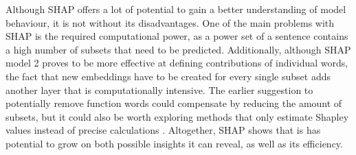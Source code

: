 Although SHAP offers a lot of potential to gain a better understanding of model behaviour, it is not without its disadvantages. One of the main problems with SHAP is the required computational power, as a power set of a sentence contains a high number of subsets that need to be predicted. Additionally, although SHAP model 2 proves to be more effective at defining contributions of individual words, the fact that new embeddings have to be created for every single subset adds another layer that is computationally intensive. The earlier suggestion to potentially remove function words could compensate by reducing the amount of subsets, but it could also be worth exploring methods that only estimate Shapley values instead of precise calculations \cite{Aas, Ancona, Chen}. Altogether, SHAP shows that is has potential to grow on both possible insights it can reveal, as well as its efficiency.